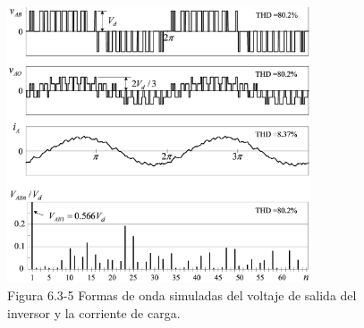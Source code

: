 \documentclass[letterpaper,12pt]{article}
\begin{document}
\begin{figure}[h]
    \centering
    \includegraphics[width=0.8\textwidth]{graficos/img143.jpg}
    \caption{Figura 6.3-5 Formas de onda simuladas del voltaje de salida del inversor y la corriente de carga.}
    \label{fig:analisis_espectral}
\end{figure}
\FloatBarrier



\end{document}
